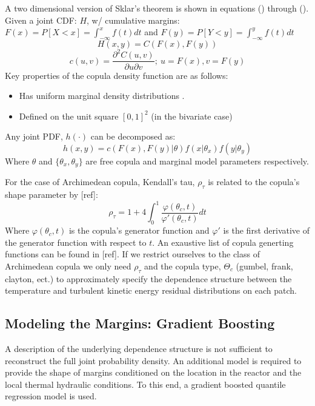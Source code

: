 A two dimensional version of Sklar's theorem is shown in equations () through ().
Given a joint CDF: $H$, w/ cumulative margins: $F(x)=P[X < x] = \int_{-\infty}^{x}f(t)dt$
and $F(y)=P[Y < y] = \int_{-\infty}^{y}f(t)dt$
\begin{equation}
H(x,y) = C(F(x), F(y))
\end{equation}
\begin{equation}
c(u, v) = \frac{\partial^2 C(u, v)}{\partial u \partial v};\ u=F(x), v=F(y)
\end{equation}
Key properties of the copula density function are as follows:
\begin{itemize}
\item  Has uniform marginal density distributions \cite{Nelsen2006}.
\item  Defined on the unit square $[0, 1]^2$ (in the bivariate case)
\end{itemize}
Any joint PDF, $h(\cdot)$ can be decomposed as:
\begin{equation}
h(x, y) = c(F(x), F(y)|\theta)f(x|\theta_x)f(y|\theta_y)
\end{equation}
Where $\theta$ and $\{\theta_{x}, \theta_{y}\}$ are free copula and marginal model parameters respectively.

For the case of Archimedean copula, Kendall's tau, $\rho_\tau$ is
related to the copula's shape parameter by [ref]:
\begin{equation}
\rho_\tau = 1 + 4 \int_0^1 \frac{\varphi(\theta_c,t)}{\varphi'(\theta_c, t)}dt
\end{equation}
Where $\varphi(\theta_c, t)$ is the copula's generator function and $\varphi'$ is the first derivative of the generator function with respect to $t$.  An exaustive list of copula generting functions can be found in [ref].
If we restrict ourselves to the class of Archimedean copula we only need $\rho_\tau$ and the copula type, $\Theta_c$ (gumbel, frank, clayton, ect.) to approximately specify the dependence structure between the temperature and turbulent kinetic energy residual distributions on each patch.

\subsection{Modeling the Margins: Gradient Boosting}

A description of the underlying dependence structure is not sufficient to reconstruct the full joint probability density.  An additional model is required to provide the shape of margins conditioned on the location in the reactor and the local thermal hydraulic conditions.  To this end, a gradient boosted quantile regression model is used.

